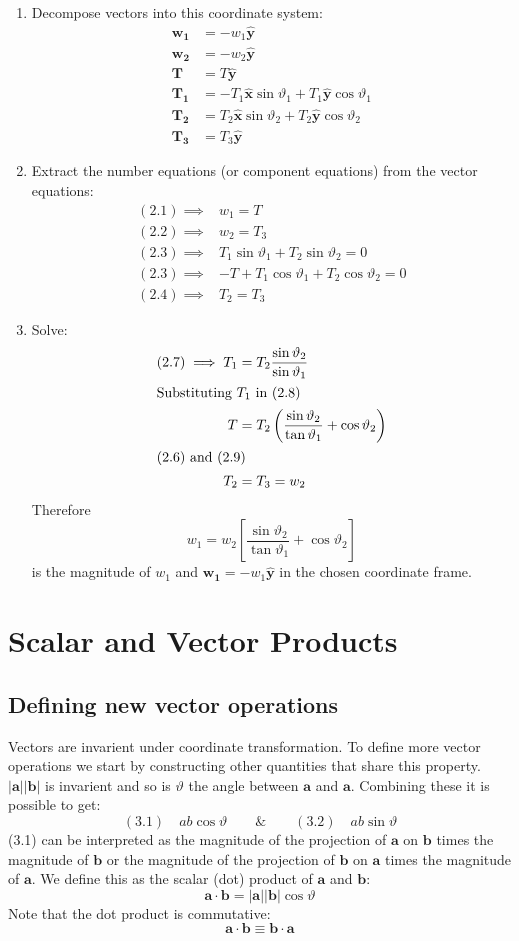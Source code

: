 \documentclass{article}
\newcommand{\vh}[1]{\vec{\hat{#1}}}
\renewcommand{\vec}[1]{\bm{#1}}
\newcommand{\vv}[1]{\vec{#1}}
\begin{document}
\begin{enumerate}
\item Decompose vectors into this coordinate system:
\begin{align*}
\vv{w_1}&=-w_1\vh y\\
\vv{w_2}&=-w_2\vh y\\
\vv T&=T\vh y\\
\vv{T_1}&=-T_1\vh x\sin\vartheta_1+T_1\vh y\cos\vartheta_1\\
\vv{T_2}&=T_2\vh x\sin\vartheta_2+T_2\vh y\cos\vartheta_2\\
\vv{T_3}&=T_3\vh y
\end{align*}
\item Extract the number equations (or component equations) from the vector equations:
\begin{align*}
(2.1)\implies& w_1=T\tag{2.5}\\
(2.2)\implies& w_2=T_3\tag{2.6}\\
(2.3)\implies& T_1\sin\vartheta_1+T_2\sin\vartheta_2=0\tag{2.7}\\
(2.3)\implies& -T+T_1\cos\vartheta_1+T_2\cos\vartheta_2=0\tag{2.8}\\
(2.4)\implies& T_2=T_3\tag{2.9}
\end{align*}
\item Solve:
\begin{align*}
(2.7)\implies T_1&=T_2\frac{\sin\vartheta_2}{\sin\vartheta_1}\\
\intertext{Substituting \(T_1\) in (2.8)}
T&=T_2\left(\frac{\sin\vartheta_2}{\tan\vartheta_1}+\cos\vartheta_2\right)\\
\intertext{(2.6) and (2.9)}
T_2&=T_3=w_2
\end{align*}
Therefore\[w_1=w_2\left[\frac{\sin\vartheta_2}{\tan\vartheta_1}+\cos\vartheta_2\right]\] is the magnitude of \(w_1\) and \(\vv{w_1}=-w_1\vh y\) in the chosen coordinate frame.
\end{enumerate}

\section{Scalar and Vector Products}

\subsection*{Defining new vector operations}

Vectors are invarient under coordinate transformation. To define more vector operations we start by constructing other quantities that share this property. \(|\vv a||\vv b|\) is invarient and so is \(\vartheta\) the angle between \(\vv a\) and \(\vv a\). Combining these it is possible to get:
\[(3.1)\quad ab\cos\vartheta\qquad\&\qquad(3.2)\quad ab\sin\vartheta\]
(3.1) can be interpreted as the magnitude of the projection of \(\vv a\) on \(\vv b\) times the magnitude of \(\vv b\) or the magnitude of the projection of \(\vv b\) on \(\vv a\) times the magnitude of \(\vv a\). We define this as the scalar (dot) product of \(\vv a\) and \(\vv b\):
\[\vv a\cdot\vv b=|\vv a||\vv b|\cos\vartheta\]
Note that the dot product is commutative:
\[\vv a\cdot\vv b\equiv\vv b\cdot\vv a\]
\end{document}
